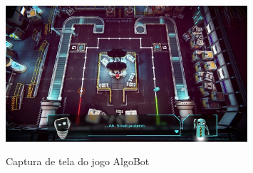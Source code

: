 \begin{figure}[H]
	\centering
	\caption{Captura de tela do jogo AlgoBot}
	\includegraphics[width=0.8\textwidth]{images/algobot.jpg}
	\label{fig:ab}
\end{figure}
